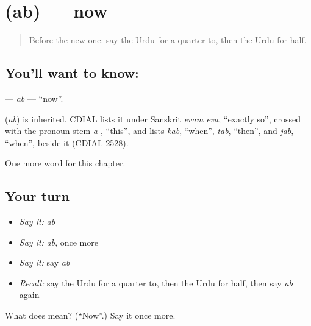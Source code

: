 \section[\texorpdfstring{\ur{اب} (ab)}{اب (ab)}]{ (ab) — now}

\label{lesson:UR-C93-ab}



\begin{quote}
Before the new one: say the Urdu for a quarter to, then the Urdu for half.
\end{quote}

\subsection*{You'll want to know: }
\textbf{} — \emph{ab} — \textquotedblleft{}now\textquotedblright{}.

\begin{cousinweb}
\textbf{} (\emph{ab}) is inherited. CDIAL lists it under Sanskrit \emph{evam eva}, \textquotedblleft{}exactly so\textquotedblright{}, crossed with the pronoun stem \emph{a-}, \textquotedblleft{}this\textquotedblright{}, and lists \emph{kab}, \textquotedblleft{}when\textquotedblright{}, \emph{tab}, \textquotedblleft{}then\textquotedblright{}, and \emph{jab}, \textquotedblleft{}when\textquotedblright{}, beside it (CDIAL 2528).
\end{cousinweb}

\begin{grammarlens}[title={What you've built}]
One more word for this chapter.
\end{grammarlens}

\subsection*{Your turn}
\begin{itemize}
\raggedright
  \item \emph{Say it:} \emph{ab}
  \item \emph{Say it:} \emph{ab}, once more
  \item \emph{Say it:} say \emph{ab}
  \item \emph{Recall:} say the Urdu for a quarter to, then the Urdu for half, then say \emph{ab} again
\end{itemize}

\begin{tcolorbox}[breakable,colback=teal!4,colframe=teal!35!black,title={Before you move on}]
What does  mean? (\textquotedblleft{}Now\textquotedblright{}.) Say it once more.
\end{tcolorbox}
